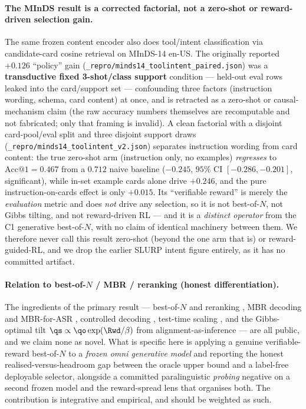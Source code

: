 \paragraph{The MInDS result is a corrected factorial, not a zero-shot or reward-driven selection gain.}
The same frozen content encoder also does tool/intent classification via candidate-card cosine
retrieval on MInDS-14 en-US. The originally reported $+0.126$ ``policy'' gain
(\texttt{\_repro/minds14\_toolintent\_paired.json}) was a \textbf{transductive fixed 3-shot/class
support} condition --- held-out eval rows leaked into the card/support set --- confounding three factors
(instruction wording, schema, card content) at once, and is retracted as a zero-shot or causal-mechanism
claim (the raw accuracy numbers themselves are recomputable and not fabricated; only that framing is
invalid). A clean factorial with a disjoint card-pool/eval split and three disjoint support draws
(\texttt{\_repro/minds14\_toolintent\_v2.json}) separates instruction wording from card content: the
true zero-shot arm (instruction only, no examples) \emph{regresses} to $\mathrm{Acc@1}=0.467$ from a
$0.712$ naive baseline ($-0.245$, $95\%$ CI $[-0.286,-0.201]$, significant), while in-set example cards
alone drive $+0.246$, and the pure instruction-on-cards effect is only $+0.015$. Its ``verifiable
reward'' is merely the \emph{evaluation} metric and does \emph{not} drive any selection, so it is not
best-of-$N$, not Gibbs tilting, and not reward-driven RL --- and it is a \emph{distinct operator} from
the C1 generative best-of-$N$, with no claim of identical machinery between them. We therefore never
call this result zero-shot (beyond the one arm that is) or reward-guided-RL, and we drop the earlier
SLURP intent figure entirely, as it has no committed artifact.

\paragraph{Relation to best-of-$N$ / MBR / reranking (honest differentiation).}
The ingredients of the primary result --- best-of-$N$ and reranking
\citep{beirami2024bon,verdun2025softbon,gui2024bonbon}, MBR decoding and MBR-for-ASR
\citep{jinnai2024mbrbon,ichihara2025mbr,mbrasr2025}, controlled decoding
\citep{mudgal2024controlled}, test-time scaling \citep{snell2024ttscompute}, and the Gibbs-optimal
tilt $\qs\propto\qo\exp(\Rwd/\beta)$ from alignment-as-inference
\citep{korbak2022kl,yang2024asymptotics} --- are all public, and we claim none as novel. What is
specific here is applying a genuine verifiable-reward best-of-$N$ to a \emph{frozen omni generative
model} and reporting the honest realised-versus-headroom gap between the oracle upper bound and a
label-free deployable selector, alongside a committed paralinguistic \emph{probing} negative on a
second frozen model and the reward-spread lens that organises both. The contribution is integrative and
empirical, and should be weighted as such.


